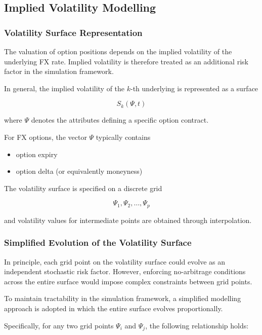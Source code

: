 \subsection{Implied Volatility Modelling}

\subsubsection{Volatility Surface Representation}

The valuation of option positions depends on the implied volatility of the underlying FX rate. Implied volatility is therefore treated as an additional risk factor in the simulation framework.

In general, the implied volatility of the $k$-th underlying is represented as a surface

\begin{equation}
	S_k(\Psi,t)
\end{equation}

where $\Psi$ denotes the attributes defining a specific option contract.

For FX options, the vector $\Psi$ typically contains

\begin{itemize}
	\item option expiry
	\item option delta (or equivalently moneyness)
\end{itemize}

The volatility surface is specified on a discrete grid

\[
\Psi_1,\Psi_2,\dots,\Psi_p
\]

and volatility values for intermediate points are obtained through interpolation.

\subsubsection{Simplified Evolution of the Volatility Surface}

In principle, each grid point on the volatility surface could evolve as an independent stochastic risk factor. However, enforcing no-arbitrage conditions across the entire surface would impose complex constraints between grid points.

To maintain tractability in the simulation framework, a simplified modelling approach is adopted in which the entire surface evolves proportionally.

Specifically, for any two grid points $\Psi_i$ and $\Psi_j$, the following relationship holds:

